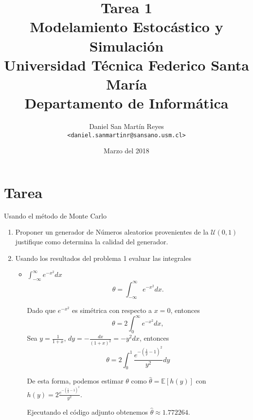\documentclass[12pt]{article}
\title{
    \large{
        \textbf{Tarea 1\\ Modelamiento Estocástico y Simulación}} \\
			\normalsize{Universidad Técnica Federico Santa María\\ Departamento de Informática\\	}
		}
\author{
    \normalsize Daniel San Martín Reyes \\ 
    \normalsize \texttt{<daniel.sanmartinr@sansano.usm.cl>}}
\date{Marzo del 2018}
\begin{document}
    \maketitle
        
    \section*{Tarea}
        Usando el método de Monte Carlo
        
        \begin{enumerate}
            \item Proponer un generador de Números aleatorios provenientes de la $\mathcal{U}(0,1)$ 
                justifique como determina la calidad del generador.
                
            \item Usando los resultados del problema 1 evaluar las integrales 
                \begin{itemize}
                    \item $\displaystyle \int_{-\infty}^{\infty}e^{-x^2}dx$
                        \begin{equation}
                            \theta  = \int_{-\infty}^{\infty}e^{-x^2}dx.
                        \end{equation}
                        
                        Dado que $e^{-x^2}$ es simétrica con respecto a $x=0$, entonces
                        \begin{equation}
                            \theta  = 2\int_{0}^{\infty}e^{-x^2}dx,
                        \end{equation}
                        Sea $y = \frac{1}{1+x}$, $dy = -\frac{dx}{(1+x)^2}= -y^2dx$, entonces
                        \begin{equation}
                            \theta = 2\int_{0}^{1}\frac{e^{-(\frac1y-1)^2}}{y^2}dy
                        \end{equation}
                        
                        De esta forma, podemos estimar $\theta$ como $\hat{\theta} = \mathbb{E}[h(y)]$
                        con $ h(y) = 2\frac{e^{-(\frac1y-1)^2}}{y^2}$.
                        
                        Ejecutando el código adjunto obtenemos $\hat{\theta} \approx 1.772264$. \bigskip                        
                        

\end{itemize}
\end{enumerate}
\end{document}
